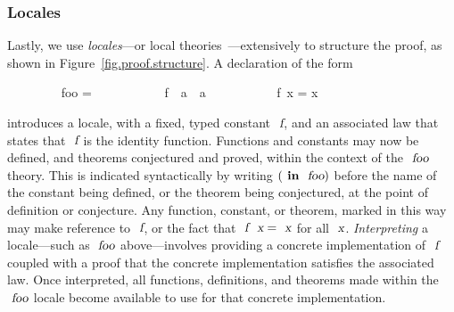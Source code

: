 \subsubsection{Locales}\label{sect.isabelle.locales}

Lastly, we use \emph{locales}---or local theories~\cite{DBLP:conf/tphol/KammullerWP99,DBLP:conf/types/HaftmannW08}---extensively to structure the proof, as shown in Figure~\ref{fig.proof.structure}.
A declaration of the form
\vspace{0.375em}
\begin{isabellebody}
\ \ \ \ \ \ \ \  foo = \isanewline
\ \ \ \ \ \ \ \ \ \ \ f\ {\isacharcolon}{\isacharcolon}\ {\isachardoublequoteopen}{\isacharprime}a\ {\isasymRightarrow}\ {\isacharprime}a{\isachardoublequoteclose}\isanewline
\ \ \ \ \ \ \ \ \ \  {\isachardoublequoteopen}f\ x = x{\isachardoublequoteclose}
\end{isabellebody}
\vspace{0.375em}
\noindent
introduces a locale, with a fixed, typed constant $\isa{f}$, and an associated law that states that $\isa{f}$ is the identity function.
Functions and constants may now be defined, and theorems conjectured and proved, within the context of the $\isa{foo}$ theory.
This is indicated syntactically by writing $(\isacommand{in}\ \isa{foo})$ before the name of the constant being defined, or the theorem being conjectured, at the point of definition or conjecture.
Any function, constant, or theorem, marked in this way may make reference to $\isa{f}$, or the fact that $\isa{f}\ \isa{x} = \isa{x}$ for all $\isa{x}$.
\emph{Interpreting} a locale---such as $\isa{foo}$ above---involves providing a concrete implementation of $\isa{f}$ coupled with a proof that the concrete implementation satisfies the associated law.
Once interpreted, all functions, definitions, and theorems made within the $\isa{foo}$ locale become available to use for that concrete implementation.
